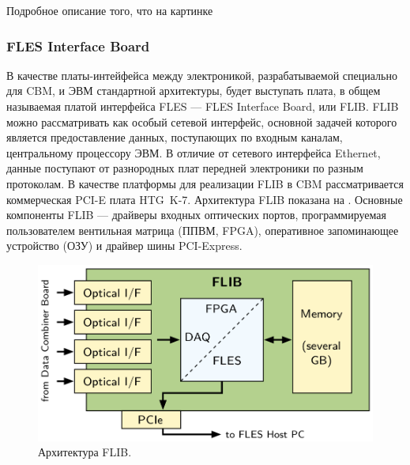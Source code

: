 \todo Подробное описание того, что на картинке

\subsubsection{FLES Interface Board}\label{sec:FLIB}

В качестве платы-интейфейса между электроникой, разрабатываемой специально для CBM, и ЭВМ стандартной архитектуры, будет выступать плата, в общем называемая платой интерфейса FLES --- FLES Interface Board, или FLIB. FLIB можно рассматривать как особый сетевой интерфейс, основной задачей которого является предоставление данных, поступающих по входным каналам, центральному процессору ЭВМ. В отличие от сетевого интерфейса Ethernet, данные поступают от разнородных плат передней электроники по разным протоколам. В качестве платформы для реализации FLIB в CBM рассматривается коммерческая PCI-E плата HTG~K-7. Архитектура FLIB показана на . Основные компоненты FLIB --- драйверы входных оптических портов, программируемая пользователем вентильная матрица (ППВМ, FPGA), оперативное запоминающее устройство (ОЗУ) и драйвер шины PCI-Express. 

\begin{figure}[H]
\centering
\includegraphics[width=1.0\textwidth]{pictures/FLIBarch.png}
\caption{Архитектура FLIB.}
\label{fig:FLIBarch}
\end{figure}